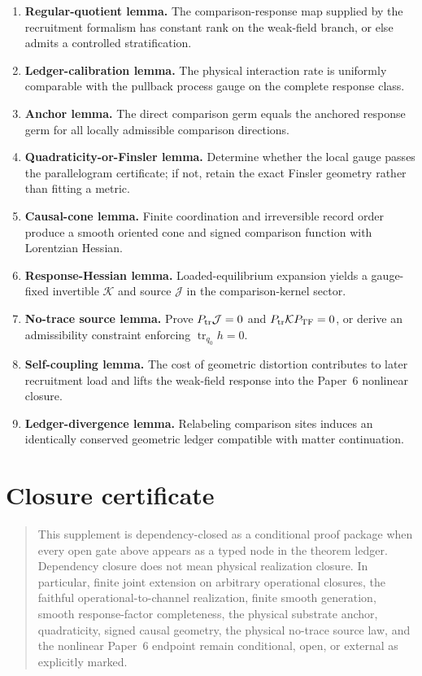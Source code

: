 \documentclass[11pt]{article}
\theoremstyle{remark}
\newcommand{\Ptr}{P_{\rm tr}}
\newcommand{\Ptf}{P_{\rm TF}}
\begin{document}
\begin{enumerate}
\item \textbf{Regular-quotient lemma.}  The comparison-response map supplied by the recruitment formalism has constant rank on the weak-field branch, or else admits a controlled stratification.
\item \textbf{Ledger-calibration lemma.}  The physical interaction rate is uniformly comparable with the pullback process gauge on the complete response class.
\item \textbf{Anchor lemma.}  The direct comparison germ equals the anchored response germ for all locally admissible comparison directions.
\item \textbf{Quadraticity-or-Finsler lemma.}  Determine whether the local gauge passes the parallelogram certificate; if not, retain the exact Finsler geometry rather than fitting a metric.
\item \textbf{Causal-cone lemma.}  Finite coordination and irreversible record order produce a smooth oriented cone and signed comparison function with Lorentzian Hessian.
\item \textbf{Response-Hessian lemma.}  Loaded-equilibrium expansion yields a gauge-fixed invertible $\mathcal K$ and source $\mathcal J$ in the comparison-kernel sector.
\item \textbf{No-trace source lemma.}  Prove $\Ptr\mathcal J=0$ and $\Ptr\mathcal K\Ptf=0$, or derive an admissibility constraint enforcing $\operatorname{tr}_{q_0}h=0$.
\item \textbf{Self-coupling lemma.}  The cost of geometric distortion contributes to later recruitment load and lifts the weak-field response into the Paper~6 nonlinear closure.
\item \textbf{Ledger-divergence lemma.}  Relabeling comparison sites induces an identically conserved geometric ledger compatible with matter continuation.
\end{enumerate}

\section{Closure certificate}
\begin{quote}
This supplement is dependency-closed as a conditional proof package when every
open gate above appears as a typed node in the theorem ledger.  Dependency
closure does not mean physical realization closure.  In particular, finite
joint extension on arbitrary operational closures, the faithful
operational-to-channel realization, finite smooth generation, smooth
response-factor completeness, the physical substrate anchor, quadraticity,
signed causal geometry, the physical no-trace source law, and the nonlinear
Paper~6 endpoint remain conditional, open, or external as explicitly marked.
\end{quote}
\end{document}
